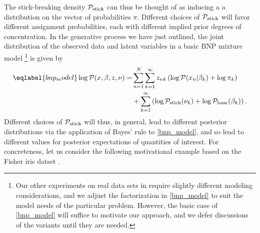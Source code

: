 The stick-breaking density $\mathcal{P}_{\mathrm{stick}}$ can thus be thought of as inducing a a
distribution on the vector of probabilities $\pi$.  Different choices of
$\mathcal{P}_{\mathrm{stick}}$ will favor different assignment probabilities, each with different
implied prior degrees of concentration. In the generative process we have just
outlined, the joint distribution of the observed data and latent variables in a
basic BNP mixture model
%
\footnote{ Our other experiments on real data sets in  require slightly different modeling considerations, and we
adjust the factorization in \eqref{bnp_model} to suit the model needs of the
particular problem.  However, the basic case of \eqref{bnp_model} will suffice
to motivate our approach, and we defer discussions of the variants until they
are needed.}
%
is given by
%
\begin{align}\eqlabel{bnp_model}
%
\logp(\x, \beta, \z, \nu) =&
\sum_{n=1}^N \sum_{k=1}^{\infty}
    \z_{\n\k} \left(
        \logp(\x_n \vert \beta_\k) + \log \pi_\k
    \right)
\nonumber\\
   & +
    \sum_{k=1}^{\infty} \left(
        \log \pstick(\nuk) + \log \pbetaprior(\beta_\k)
    \right).
%
\end{align}
%
Different choices of $\mathcal{P}_{\mathrm{stick}}$ will thus, in general, lead to different
posterior distributions via the application of Bayes' rule to \eqref{bnp_model},
and so lead to different values for posterior expectations of quantities of
interest.  For concreteness, let us consider the following motivational example
based on the Fisher iris datset \citep{anderson:1936:iris, fisher:1936:iris}.

